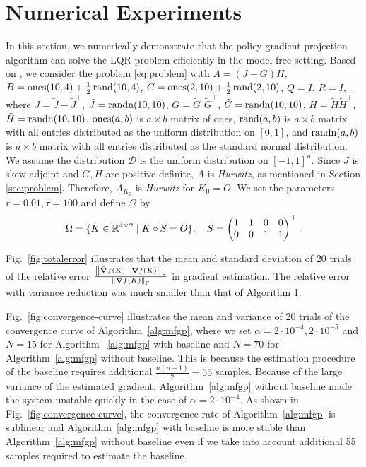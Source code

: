 % 
\section{Numerical Experiments}\label{sec:experiments}
In this section, we numerically demonstrate that the policy gradient projection algorithm can solve
the LQR problem efficiently in the model free setting.
Based on \cite{fatkhullin2021optimizing}, we consider the problem \eqref{eq:problem} with
$A  =(J-G)H$,
$B  = \operatorname{ones}(10, 4)+\frac{1}{2}\operatorname{rand}(10, 4)$,
$C  = \operatorname{ones}(2, 10)+\frac{1}{2}\operatorname{rand}(2, 10)$,
$Q  = I$,
$R  = I$,
where
$J = \tilde J - \tilde J^\top$, $\tilde J = \operatorname{randn}(10, 10)$,
$G = \tilde G$  $\tilde G^\top$, $\tilde G = \operatorname{randn}(10, 10)$,
$H = \tilde H \tilde H^\top$, $\tilde H = \operatorname{randn}(10, 10)$,
$\operatorname{ones}(a, b)$ is $a\times b$ matrix of ones,
$\operatorname{rand}(a, b)$ is $a\times b$ matrix with all entries distributed as the uniform distribution on $[0, 1]$,
and $\operatorname{randn}(a, b)$ is $a\times b$ matrix with all entries distributed as the standard normal distribution.
We assume the distribution $\mathcal{D}$ is the uniform distribution on $[-1, 1]^n$.
Since $J$ is skew-adjoint and $G, H$ are positive definite,
$A$ is \textit{Hurwitz}, as mentioned in Section \ref{sec:problem}.
Therefore, $A_{K_0}$ is \textit{Hurwitz} for $K_0 = O$.
We set the parameters $r = 0.01, \tau = 100$
and define $\Omega$ by
\begin{align}
	\Omega = \{K\in \mathbb{R}^{4\times 2}\mid K\circ S = O\},\quad S =\begin{pmatrix}
		1 & 1 & 0 & 0 \\
		0 & 0 & 1 & 1
	\end{pmatrix}^\top.
\end{align}

Fig.~\ref{fig:totalerror} illustrates that
the mean and standard deviation of 20 trials of the relative error
$\frac{\norm{\bar \grad f(K)-\grad f(K)}_\mathrm{F}}{\norm{\grad f(K)}_\mathrm{F}}$
in gradient estimation.
The relative error with variance reduction was much smaller than that of Algorithm 1.

Fig.~\ref{fig:convergence-curve} illustrates the mean and variance of 20 trials of the convergence curve of Algorithm~\ref{alg:mfgp},
where we set $\alpha = 2\cdot 10^{-4}, 2\cdot 10^{-5}$ and $N=15$ for Algorithm ~\ref{alg:mfgp} with baseline and $N=70$ for Algorithm~\ref{alg:mfgp} without baseline. This is because the estimation procedure of the baseline requires additional $\frac{n(n+1)}{2}=55$ samples.
Because of the large variance of the estimated gradient, Algorithm~\ref{alg:mfgp} without baseline made the system unstable quickly in the case of $\alpha=2\cdot 10^{-4}$.
As shown in Fig.~\ref{fig:convergence-curve}, the convergence rate of Algorithm~\ref{alg:mfgp} is sublinear and Algorithm~\ref{alg:mfgp} with baseline is more stable than Algorithm~\ref{alg:mfgp} without baseline even if we take into account additional 55 samples required to estimate the baseline.

